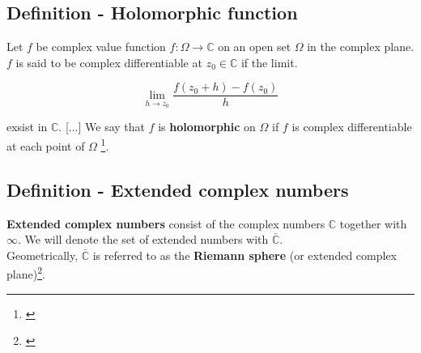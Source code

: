 \documentclass{article}
\begin{document}
\subsection{Definition - Holomorphic function}
Let $f$ be complex value function $f:\Omega \rightarrow \mathbb{C}$ on an open set $\Omega$ in the complex plane. $f$ is said to be complex differentiable at $z_{0} \in \mathbb{C}$ if the limit.

\begin{equation}
 \lim_{h\to z_{0}} \frac{f(z_{0} + h) - f(z_{0})}{h} 
\end{equation}

exsist in $\mathbb{C}$. [$\ldots$] We say that $f$ is \textbf{holomorphic} on $\Omega$ if $f$ is complex differentiable at each point of $\Omega$ \footnote{\cite{LarsV.Ahlfors1985}}.	

\subsection{Definition - Extended complex numbers}
\textbf{Extended complex numbers} consist of the complex numbers $\mathbb{C}$ together with $\infty$.
We will denote the set of extended numbers with $\bar{\mathbb{C}}$.
\\
Geometrically, $\bar{\mathbb{C}}$ is referred to as the \textbf{Riemann sphere} (or extended complex plane)\footnote{\cite{ToddRowland}}.

\pagebreak
\end{document}
